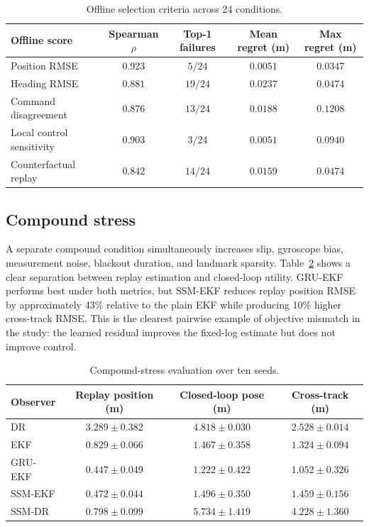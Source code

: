 \documentclass[11pt]{article}
\newcommand{\obs}[1]{\textsc{#1}}
\begin{document}
\begin{table}[H]
\centering
\caption{Offline selection criteria across 24 conditions.}
\label{tab:proxy}
\small
\begin{tabular}{lcccc}
\toprule
Offline score & Spearman $\rho$ & Top-1 failures & Mean regret (m) & Max regret (m) \\
\midrule
Position RMSE & $0.923$ & $5/24$ & $0.0051$ & $0.0347$ \\
Heading RMSE & $0.881$ & $19/24$ & $0.0237$ & $0.0474$ \\
Command disagreement & $0.876$ & $13/24$ & $0.0188$ & $0.1208$ \\
Local control sensitivity & $0.903$ & $3/24$ & $0.0051$ & $0.0940$ \\
Counterfactual replay & $0.842$ & $14/24$ & $0.0159$ & $0.0474$ \\
\bottomrule
\end{tabular}
\end{table}

\subsection{Compound stress}
A separate compound condition simultaneously increases slip, gyroscope bias, measurement noise, blackout duration, and landmark sparsity. Table~\ref{tab:compound} shows a clear separation between replay estimation and closed-loop utility. GRU-EKF performs best under both metrics, but SSM-EKF reduces replay position RMSE by approximately 43\% relative to the plain EKF while producing 10\% higher cross-track RMSE. This is the clearest pairwise example of objective mismatch in the study: the learned residual improves the fixed-log estimate but does not improve control.

\begin{table}[H]
\centering
\caption{Compound-stress evaluation over ten seeds.}
\label{tab:compound}
\small
\begin{tabular}{lccc}
\toprule
Observer & Replay position (m) & Closed-loop pose (m) & Cross-track (m) \\
\midrule
\obs{DR} & $3.289\pm0.382$ & $4.818\pm0.030$ & $2.528\pm0.014$ \\
\obs{EKF} & $0.829\pm0.066$ & $1.467\pm0.358$ & $1.324\pm0.094$ \\
\obs{GRU-EKF} & $\mathbf{0.447\pm0.049}$ & $\mathbf{1.222\pm0.422}$ & $\mathbf{1.052\pm0.326}$ \\
\obs{SSM-EKF} & $0.472\pm0.044$ & $1.496\pm0.350$ & $1.459\pm0.156$ \\
\obs{SSM-DR} & $0.798\pm0.099$ & $5.734\pm1.419$ & $4.228\pm1.360$ \\
\bottomrule
\end{tabular}
\end{table}
\end{document}
